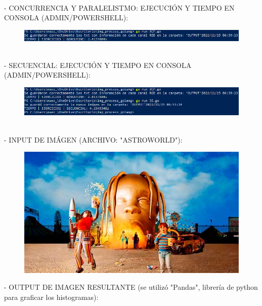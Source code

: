 \documentclass{article}
\begin{document}
\\
- CONCURRENCIA Y PARALELISTMO: EJECUCIÓN Y TIEMPO EN CONSOLA (ADMIN/POWERSHELL):
\begin{figure}[h]
\centering
\includegraphics[scale=0.75]{CON3.png}
\end{figure}
\\
- SECUENCIAL: EJECUCIÓN Y TIEMPO EN CONSOLA (ADMIN/POWERSHELL):
\begin{figure}[h]
\centering
\includegraphics[scale=0.75]{SEC3.png}
\end{figure}
\\
- INPUT DE IMÁGEN (ARCHIVO: "ASTROWORLD"):
\begin{figure}[h]
\centering
\includegraphics[scale=0.60]{ASTROWORLD.jpg}
\end{figure}
- OUTPUT DE IMAGEN RESULTANTE (se utilizó "Pandas", librería de python para graficar los histogramas):
\end{document}
